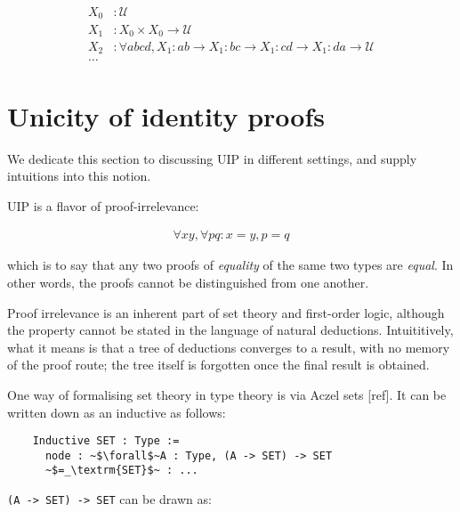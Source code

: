 \documentclass[10pt]{amsart}
\newcommand{\UU}{\ensuremath{\mathscr{U}}}
\theoremstyle{definition}
\numberwithin{definition}{subsection}
\numberwithin{definition}{section}
\begin{document}
\begin{align*}
  X_0 & : \UU                                                                                                      \\
  X_1 & : X_0 \times X_0 \rightarrow \UU                                                                           \\
  X_2 & : \forall a b c d, X_1 : ab \rightarrow X_1 : bc \rightarrow X_1 : cd \rightarrow X_1 : da \rightarrow \UU \\
  \ldots
\end{align*}

\section{Unicity of identity proofs\label{sec:uip}}
We dedicate this section to discussing UIP in different settings, and supply intuitions into this notion.

UIP is a flavor of proof-irrelevance:

\begin{align*}
  \forall x y, \forall p q : x = y, p = q
\end{align*}

which is to say that any two proofs of \emph{equality} of the same two types are \emph{equal}. In other words, the proofs cannot be distinguished from one another.

Proof irrelevance is an inherent part of set theory and first-order logic, although the property cannot be stated in the language of natural deductions. Intuititively, what it means is that a tree of deductions converges to a result, with no memory of the proof route; the tree itself is forgotten once the final result is obtained.

One way of formalising set theory in type theory is via Aczel sets [ref]. It can be written down as an inductive as follows:

\begin{listing}[H]
  \begin{verbatim}
    Inductive SET : Type :=
      node : ~$\forall$~A : Type, (A -> SET) -> SET
      ~$=_\textrm{SET}$~ : ...
  \end{verbatim}
\end{listing}

\texttt{(A -> SET) -> SET} can be drawn as:
\end{document}
